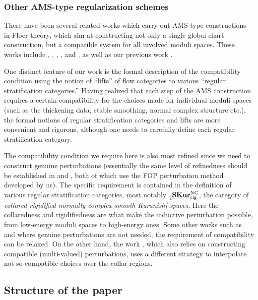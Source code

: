 \documentclass[reqno, 10pt]{amsart}
\numberwithin{equation}{section}
\numberwithin{equation}{section}
\theoremstyle{definition}
\theoremstyle{remark}
\renewcommand{\outer}{{}_{\lfloor}}
\newcommand{\uds}[1]{\underline{\smash{#1}}}
\begin{document}
\subsubsection{Other AMS-type regularization schemes}

There have been several related works which carry out AMS-type constructions in Floer theory, which aim at constructing not only a single global chart construction, but a compatible system for all involved moduli spaces. These works include  \cite{Rezchikov_Arnold},  \cite{Hirschi_Hugtenburg}, \cite{Chanda_Hirschi_contact}, \cite{Mak_Seyfaddini_Smith_1}, and \cite{Rabah_thesis}, as well as our previous work \cite{Bai_Xu_Arnold}.

One distinct feature of our work is the formal  description of the compatibility condition using the notion of ``lifts'' of flow categories to various ``regular stratification categories.'' Having realized that each step of the AMS construction requires a certain compatibility for the choices made for individual moduli spaces (such as the thickening data, stable smoothing, normal complex structure etc.), the formal notions of regular stratification categories and lifts are more convenient and rigorous, although one needs to carefully define each regular stratification category.

The compatibility condition we require here is also most refined since we need to construct genuine perturbations (essentially the same level of refinedness should be established in \cite{Rezchikov_Arnold} and \cite{Rabah_thesis}, both of which use the FOP perturbation method developed by us). The specific requirement is contained in the definition of various regular stratification categories, most notably $\outer \uds{\bf SKur}_{\rm rig}^{\rm NC}$, the category of {\it collared rigidified normally complex smooth Kuranishi spaces}. Here the collaredness and rigidifiedness are what make the inductive perturbation possible, from low-energy moduli spaces to high-energy ones. Some other works such as \cite{Hirschi_Hugtenburg} and \cite{Chanda_Hirschi_contact} where genuine perturbations are not needed, the requirement of compatibility can be relaxed. On the other hand, the work \cite{Mak_Seyfaddini_Smith_1}, which also relies on constructing compatible (multi-valued) perturbations, uses a different strategy to interpolate not-so-compatible choices over the collar regions.

\subsection{Structure of the paper}
\end{document}
